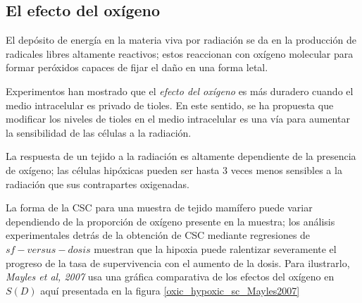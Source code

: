 \documentclass[12pt,letterpaper, oneside]{book}
\begin{document}
		\subsection{El efecto del oxígeno}
			El depósito de energía en la materia viva por radiación se da en la producción de radicales libres altamente reactivos; estos reaccionan con oxígeno molecular para formar peróxidos capaces de fijar el daño en una forma letal\cite{Bleehen.2007}.
			
			Experimentos han mostrado que el \textit{efecto del oxígeno} es más duradero cuando el medio intracelular es privado de tioles\cite{Bleehen.2007}. En este sentido, se ha propuesta que modificar los niveles de tioles en el medio intracelular es una vía para aumentar la sensibilidad de las células a la radiación\cite{Bleehen.2007}. 
			
			La respuesta de un tejido a la radiación es altamente dependiente de la presencia de oxígeno\cite{Bleehen.2007, Mayles.2007}; las células hipóxicas pueden ser hasta 3 veces menos sensibles a la radiación que sus contrapartes oxigenadas\cite{Bleehen.2007}. 
			
			La forma de la CSC para una muestra de tejido mamífero puede variar dependiendo de la proporción de oxígeno presente en la muestra\cite{Bleehen.2007, Mayles.2007, Tubiana.1990}; los análisis experimentales detrás de la obtención de CSC mediante regresiones de $sf-versus-dosis$ muestran que la hipoxia puede ralentizar severamente el progreso de la tasa de supervivencia con el aumento de la dosis. Para ilustrarlo, \textit{Mayles et al, 2007} usa una gráfica comparativa de los efectos del oxígeno en $S(D)$ aquí presentada en la figura \ref{oxic_hypoxic_sc_Mayles2007}
			
\end{document}
